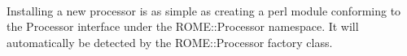 
\paragraph{}
Installing a new processor is as simple as creating a perl module conforming to the Processor interface under the ROME::Processor namespace. It will automatically be detected by the ROME::Processor factory class.










